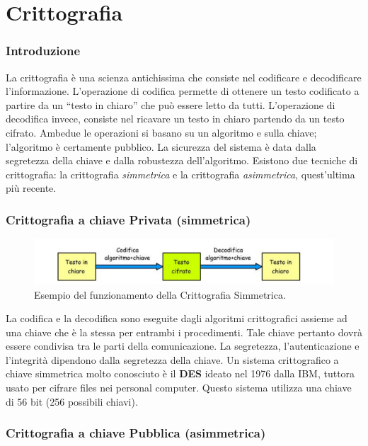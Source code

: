 \part{Crittografia}

\section{Introduzione}

La crittografia è una scienza antichissima che consiste nel codificare e
decodificare l'informazione.
L'operazione di codifica permette di ottenere un testo codificato a partire da
un “testo in chiaro” che
può essere letto da tutti.
L'operazione di decodifica invece, consiste nel ricavare un testo in chiaro
partendo da un
testo cifrato. Ambedue le operazioni si basano su un algoritmo e sulla chiave;
l'algoritmo è
certamente pubblico. La sicurezza del sistema è data dalla segretezza della
chiave e dalla
robustezza dell'algoritmo. Esistono due tecniche di crittografia:
la crittografia \textit{simmetrica} e la
crittografia \textit{asimmetrica}, quest'ultima più recente.

\section{Crittografia a chiave Privata (simmetrica)}

\begin{figure}[H]
    \centering
    \includegraphics[width=\textwidth, keepaspectratio]{capitoli/crittografia/imgs/privata.png}
    \caption{Esempio del funzionamento della Crittografia Simmetrica.}
\end{figure}

La codifica e la decodifica sono eseguite dagli algoritmi crittografici assieme
ad una chiave che è la
stessa per entrambi i procedimenti. Tale chiave pertanto dovrà essere condivisa
tra le parti della
comunicazione. La segretezza, l'autenticazione e l'integrità dipendono dalla
segretezza della chiave.
Un sistema crittografico a chiave simmetrica molto conosciuto è il
\textbf{DES} ideato nel 1976 dalla IBM,
tuttora usato per cifrare files nei personal computer.
Questo sistema utilizza una chiave di 56 bit
(256 possibili chiavi).

\section{Crittografia a chiave Pubblica (asimmetrica)}

